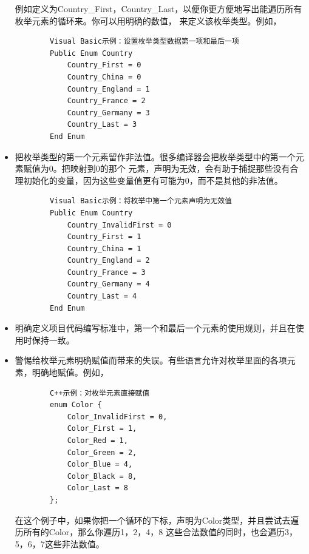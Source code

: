 \documentclass{article}
\begin{document}
\begin{itemize}
    例如定义为Country\_First，Country\_Last，以便你更方便地写出能遍历所有枚举元素的循环来。你可以用明确的数值，
    来定义该枚举类型。例如，
    \begin{lstlisting}
        Visual Basic示例：设置枚举类型数据第一项和最后一项
        Public Enum Country
            Country_First = 0
            Country_China = 0
            Country_England = 1
            Country_France = 2
            Country_Germany = 3
            Country_Last = 3
        End Enum
    \end{lstlisting}
    \item 把枚举类型的第一个元素留作非法值。很多编译器会把枚举类型中的第一个元素赋值为0。把映射到0的那个
    元素，声明为无效，会有助于捕捉那些没有合理初始化的变量，因为这些变量值更有可能为0，而不是其他的非法值。
    \begin{lstlisting}
        Visual Basic示例：将枚举中第一个元素声明为无效值
        Public Enum Country
            Country_InvalidFirst = 0
            Country_First = 1
            Country_China = 1
            Country_England = 2
            Country_France = 3
            Country_Germany = 4
            Country_Last = 4
        End Enum
    \end{lstlisting}
    \item 明确定义项目代码编写标准中，第一个和最后一个元素的使用规则，并且在使用时保持一致。
    \item 警惕给枚举元素明确赋值而带来的失误。有些语言允许对枚举里面的各项元素，明确地赋值。例如，
    \begin{lstlisting}
        C++示例：对枚举元素直接赋值
        enum Color {
            Color_InvalidFirst = 0,
            Color_First = 1,
            Color_Red = 1,
            Color_Green = 2,
            Color_Blue = 4,
            Color_Black = 8,
            Color_Last = 8
        };
    \end{lstlisting}
    在这个例子中，如果你把一个循环的下标，声明为Color类型，并且尝试去遍历所有的Color，那么你遍历1，2，4，8
    这些合法数值的同时，也会遍历3，5，6，7这些非法数值。
\end{itemize}
\end{document}

